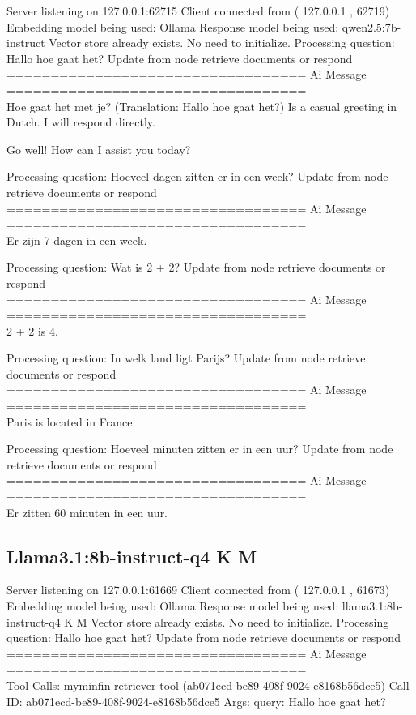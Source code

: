 Server listening on 127.0.0.1:62715
Client connected from ( 127.0.0.1 , 62719)
Embedding model being used: Ollama
Response model being used: qwen2.5:7b-instruct
Vector store already exists. No need to initialize.
Processing question: Hallo hoe gaat het?
Update from node retrieve  documents  or  respond
\\[1em]
================================== Ai Message ==================================
\\[1em]
Hoe gaat het met je? (Translation: Hallo hoe gaat het?) Is a casual greeting in Dutch. I will respond directly.

Go well! How can I assist you today?

Processing question: Hoeveel dagen zitten er in een week?
Update from node retrieve  documents  or  respond
\\[1em]
================================== Ai Message ==================================
\\[1em]
Er zijn 7 dagen in een week.

Processing question: Wat is 2 + 2?
Update from node retrieve  documents  or  respond
\\[1em]
================================== Ai Message ==================================
\\[1em]
2 + 2 is 4.

Processing question: In welk land ligt Parijs?
Update from node retrieve  documents  or  respond
\\[1em]
================================== Ai Message ==================================
\\[1em]
Paris is located in France.

Processing question: Hoeveel minuten zitten er in een uur?
Update from node retrieve  documents  or  respond
\\[1em]
================================== Ai Message ==================================
\\[1em]
Er zitten 60 minuten in een uur.


\subsection{Llama3.1:8b-instruct-q4 K M}

Server listening on 127.0.0.1:61669
Client connected from ( 127.0.0.1 , 61673)
Embedding model being used: Ollama
Response model being used: llama3.1:8b-instruct-q4 K M
Vector store already exists. No need to initialize.
Processing question: Hallo hoe gaat het?
Update from node retrieve documents or respond
\\[1em]
================================== Ai Message ==================================
\\[1em]
Tool Calls:
myminfin retriever tool (ab071ecd-be89-408f-9024-e8168b56dce5)
Call ID: ab071ecd-be89-408f-9024-e8168b56dce5
Args:
query: Hallo hoe gaat het?



